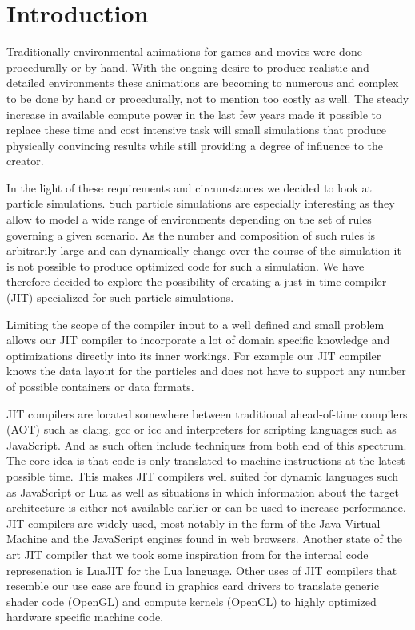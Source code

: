 \section{Introduction}\label{sec:intro}

Traditionally environmental animations for games and movies were done procedurally or by hand. With the ongoing desire to produce realistic and detailed environments these animations are becoming to numerous and complex to be done by hand or procedurally, not to mention too costly as well. The steady increase in available compute power in the last few years made it possible to replace these time and cost intensive task will small simulations that produce physically convincing results while still providing a degree of influence to the creator.

In the light of these requirements and circumstances we decided to look at particle simulations. Such particle simulations are especially interesting as they allow to model a wide range of environments depending on the set of rules governing a given scenario. As the number and composition of such rules is arbitrarily large and can dynamically change over the course of the simulation it is not possible to produce optimized code for such a simulation. We have therefore decided to explore the possibility of creating a just-in-time compiler (JIT) specialized for such particle simulations.

Limiting the scope of the compiler input to a well defined and small problem allows our JIT compiler to incorporate a lot of domain specific knowledge and optimizations directly into its inner workings. For example our JIT compiler knows the data layout for the particles and does not have to support any number of possible containers or data formats.

JIT compilers are located somewhere between traditional ahead-of-time compilers (AOT) such as clang\cite{clang}, gcc\cite{gcc} or icc\cite{icc} and interpreters for scripting languages such as JavaScript. And as such often include techniques from both end of this spectrum. The core idea is that code is only translated to machine instructions at the latest possible time. This makes JIT compilers well suited for dynamic languages such as JavaScript or Lua as well as situations in which information about the target architecture is either not available earlier or can be used to increase performance. JIT compilers are widely used, most notably in the form of the Java Virtual Machine\cite{jvm} and the JavaScript\cite{v8}\cite{SpiderMonkey} engines found in web browsers. Another state of the art JIT compiler that we took some inspiration from for the internal code represenation is LuaJIT \cite{LuaJIT}\cite{LuaJITir} for the Lua language. Other uses of JIT compilers that resemble our use case are found in graphics card drivers to translate generic shader code (OpenGL) and compute kernels (OpenCL) to highly optimized hardware specific machine code.


